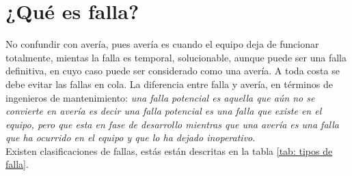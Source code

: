 \documentclass[
	12pt, %
	fleqn, %
	a4paper, %
]{LegrandOrangeBook}
\begin{document}
\section{¿Qué es falla?}
No confundir con avería, pues avería es cuando el equipo deja de funcionar totalmente, mientas la falla es temporal, solucionable, aunque puede ser una falla definitiva, en cuyo caso puede ser considerado como una avería. A toda costa se debe evitar las fallas en cola. 
La diferencia entre falla y avería, en términos de ingenieros de mantenimiento: \emph{una falla potencial es aquella que aún no se convierte en avería es decir una falla potencial es una falla que existe en el equipo, pero que esta en fase de desarrollo mientras que una avería es una falla que ha ocurrido en el equipo y que lo ha dejado inoperativo}.\\
Existen clasificaciones de fallas, estás están descritas en la tabla \ref{tab: tipos de falla}.
\end{document}
